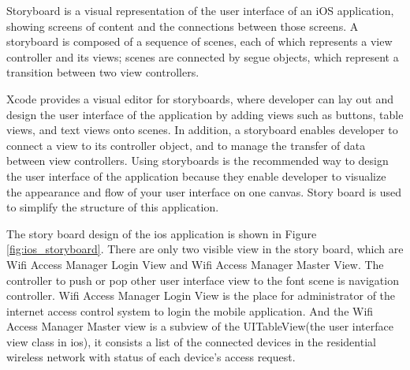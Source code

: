 \par Storyboard\cite{xcode_storyboard} is a visual representation of the user interface of an iOS application, showing screens of content and the connections between those screens. A storyboard is composed of a sequence of scenes, each of which represents a view controller and its views; scenes are connected by segue objects, which represent a transition between two view controllers.

\par Xcode provides a visual editor for storyboards, where developer can lay out and design the user interface of the application by adding views such as buttons, table views, and text views onto scenes. In addition, a storyboard enables developer to connect a view to its controller object, and to manage the transfer of data between view controllers. Using storyboards is the recommended way to design the user interface of the application because they enable developer to visualize the appearance and flow of your user interface on one canvas. Story board is used to simplify the structure of this application.

\par The story board design of the \gls{ios} application is shown in Figure \ref{fig:ios_storyboard}. There are only two visible view in the story board, which are Wifi Access Manager Login View and Wifi Access Manager Master View. The controller to push or pop other user interface view to the font scene is navigation controller. Wifi Access Manager Login View is the place for administrator of the internet access control system to login the mobile application. And the Wifi Access Manager Master view is a subview of the UITableView(the user interface view class in \gls{ios}), it consists a list of the connected devices in the residential wireless network with status of each device's access request.


